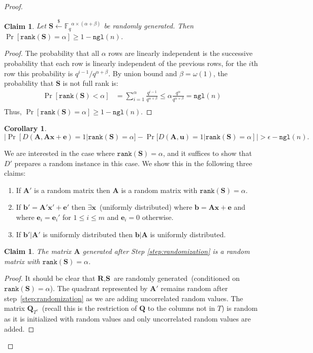 \documentclass[11pt]{article}
\newcommand{\vect}[1]{\ensuremath{\textbf{#1}}}
\newcommand{\Fq}{\ensuremath{\mathbb{F}_q}}
\newcommand{\rank}{\ensuremath{\mathtt{rank}}\xspace}
\newcommand{\ngl}{\ensuremath{\mathtt{ngl}}\xspace}
\newtheorem{corollary}[theorem]{Corollary}
\newtheorem{claim}[theorem]{Claim}
\newcommand{\authnote}[2]{{\textcolor{red}{\textsf{#1 notes: }\textcolor{blue}{ #2}}\marginpar{\textcolor{red}{\textbf{!!!!!}}}}}
\newcommand{\authnote}[2]{}
\newcommand{\bnote}[1]{{\authnote{Ben}{#1}}}
\newcommand{\ve}{\vect{e}}
\newcommand{\vS}{\vect{S}}
\newcommand{\vA}{\vect{A}}
\newcommand{\vQ}{\vect{Q}}
\newcommand{\vR}{\vect{R}}
\newcommand{\vx}{\vect{x}}
\newcommand{\vb}{\vect{b}}
\newcommand{\vu}{\vect{u}}
\begin{document}
\begin{proof}
\begin{claim}
\label{cl:full rank matrix}
Let $\vS \overset{\$}\leftarrow \Fq^{\alpha \times (\alpha+\beta)}$ be randomly generated.  Then $\Pr[\rank(\vS)=\alpha]\geq  1- \ngl(n)$.
\end{claim}
\begin{proof}
The probability that all $\alpha$ rows are linearly independent is the successive probability that each row is linearly independent of the previous rows, for the $i$th row this probability is $q^{i-1}/q^{\alpha+\beta}$.  By union bound and $\beta = \omega(1)$, the probability that $\vS$ is not full rank is:
\begin{align*}
\Pr[\rank(\vS) < \alpha] &= \sum_{i=1}^{\alpha} \frac{q^{i-1}}{q^{\alpha+\beta}}
\leq \alpha \frac{q^{\alpha}}{q^{\alpha+\beta} }=\ngl(n)\\
\end{align*}
Thus, $\Pr[\rank(\vS) = \alpha] \geq 1-\ngl(n)$.
\end{proof}
\begin{corollary}
$
|\Pr[D(\vA, \vA\vx+\ve) = 1  | \rank(\vS) = \alpha] - \Pr[D(\vA, \vu) =1 | \rank(\vS) = \alpha]|> \epsilon - \ngl(n).
$
\end{corollary}

We are interested in the case where $\rank(\vS) = \alpha$, and it suffices to show that $D'$ prepares a random instance in this case. We show this in the following three claims: 
\begin{enumerate}
\item If $\vA'$ is a random matrix then $\vA$ is a random matrix with $\rank(\vS) = \alpha$.
\item If $\vb' = \vA'\vx'+\ve'$ then $\exists \vx$~(uniformly distributed) where $\vb = \vA \vx + \ve$ and where $\ve_i = \ve_i'$ for $1\leq i\leq m$ and $\ve_i = 0$ otherwise.
\item If $\vb' | \vA'$ is uniformly distributed then $\vb | \vA$ is uniformly distributed.
\end{enumerate}

\begin{claim}
\label{cl:randomMatrixDist}
The matrix $\vA$ generated after Step \ref{step:randomization} is a random matrix with $\rank(\vS) = \alpha$.
\end{claim}
\begin{proof}
It should be clear that $\vR, \vS$ are randomly generated~(conditioned on $\rank(\vS) =\alpha$).  The quadrant represented by $\vA'$ remains random after step~\ref{step:randomization} as we are adding uncorrelated random values.  
The matrix $\vQ_{T^c}$~(recall this is the restriction of $\vQ$ to the columns not in $T$) is random as it is initialized with random values and only uncorrelated random values are added.


\end{proof}
\end{proof}
\end{document}

